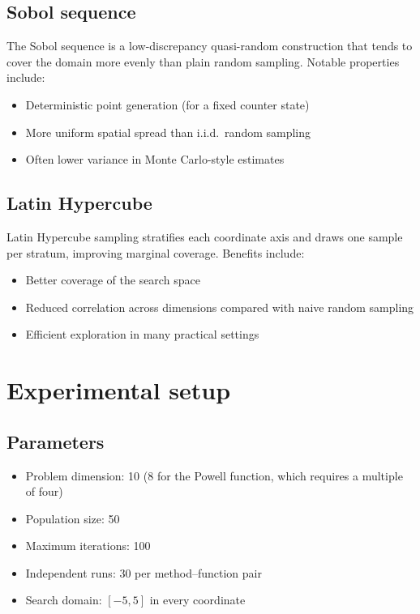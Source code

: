 \documentclass[12pt,a4paper]{article}
\begin{document}
\subsection{Sobol sequence}
The Sobol sequence is a low-discrepancy quasi-random construction that tends to cover the domain more evenly than plain random sampling. Notable properties include:
\begin{itemize}
    \item Deterministic point generation (for a fixed counter state)
    \item More uniform spatial spread than i.i.d.\ random sampling
    \item Often lower variance in Monte Carlo-style estimates
\end{itemize}

\subsection{Latin Hypercube}
Latin Hypercube sampling stratifies each coordinate axis and draws one sample per stratum, improving marginal coverage. Benefits include:
\begin{itemize}
    \item Better coverage of the search space
    \item Reduced correlation across dimensions compared with naive random sampling
    \item Efficient exploration in many practical settings
\end{itemize}

\section{Experimental setup}

\subsection{Parameters}
\begin{itemize}
    \item Problem dimension: 10 (8 for the Powell function, which requires a multiple of four)
    \item Population size: 50
    \item Maximum iterations: 100
    \item Independent runs: 30 per method--function pair
    \item Search domain: $[-5, 5]$ in every coordinate
\end{itemize}
\end{document}
